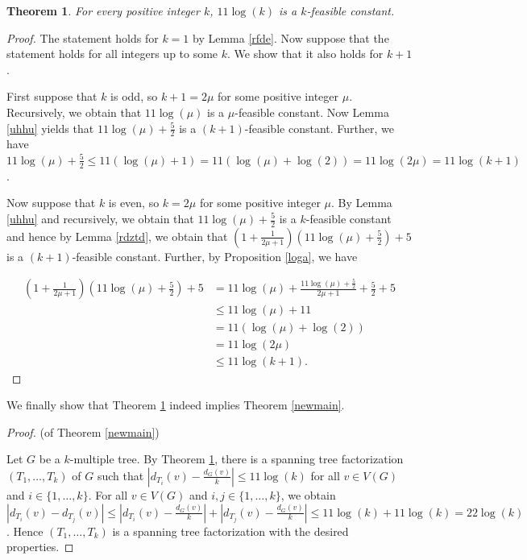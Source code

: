 \documentclass{article}
\theoremstyle{plain}
\newtheorem{Theorem}{Theorem}
\theoremstyle{nonumberplain}
\theoremstyle{nonumberplain}
\newcommand{\stf}{spanning tree factorization }
\begin{document}
\begin{Theorem}\label{tech}
For every positive integer $k$, $11 \log (k)$ is a $k$-feasible constant.
\end{Theorem}
\begin{proof}
The statement holds for $k=1$ by Lemma \ref{rfde}. Now suppose that the statement holds for all integers up to some $k$. We show that it also holds for $k+1$.

First suppose that $k$ is odd, so $k+1=2 \mu$ for some positive integer $\mu$. Recursively, we obtain that $11 \log (\mu)$ is a $\mu$-feasible constant. Now Lemma \ref{uhhu} yields that $11 \log (\mu) +\frac{5}{2}$ is a $(k+1)$-feasible constant. Further, we have $11 \log (\mu) +\frac{5}{2} \leq 11(\log (\mu )+1)=11(\log (\mu) +\log (2))=11\log(2 \mu)=11 \log(k+1)$.

Now suppose that $k$ is even, so $k=2 \mu$ for some positive integer $\mu$. By Lemma \ref{uhhu} and recursively, we obtain that  $11 \log (\mu) +\frac{5}{2}$ is a $k$-feasible constant and hence by Lemma \ref{rdztd}, we obtain that $(1+\frac{1}{2 \mu +1})(11 \log (\mu) +\frac{5}{2})+5$ is a $(k+1)$-feasible constant. Further, by Proposition \ref{loga}, we have

\begin{align*}
(1+\frac{1}{2 \mu +1})(11 \log (\mu) +\frac{5}{2})+5&=11 \log (\mu)+\frac{11 \log (\mu) +\frac{5}{2}}{2 \mu +1}+\frac{5}{2}+5\\
&\leq 11 \log (\mu) + 11\\
& = 11(\log (\mu)+\log (2))\\
&=11\log (2 \mu)\\
&\leq 11 \log (k+1). 
\end{align*}
\end{proof}

We finally show that Theorem \ref{tech} indeed implies Theorem \ref{newmain}.

\begin{proof}(of Theorem \ref{newmain})

Let $G$ be a $k$-multiple tree. By Theorem \ref{tech}, there is a \stf $(T_1,\ldots,T_k)$ of $G$ such that $|d_{T_i}(v)-\frac{d_G(v)}{k}|\leq 11 \log(k)$ for all $v \in V(G)$ and $i \in \{1,\ldots,k\}$. For all $v \in V(G)$ and $i,j \in \{1,\ldots,k\}$, we obtain $|d_{T_i}(v)-d_{T_j}(v)|\leq |d_{T_i}(v)-\frac{d_G(v)}{k}|+|d_{T_j}(v)-\frac{d_G(v)}{k}|\leq 11 \log(k)+11 \log(k)=22 \log(k)$. Hence $(T_1,\ldots, T_k)$ is a \stf with the desired properties.
\end{proof}
\end{document}
